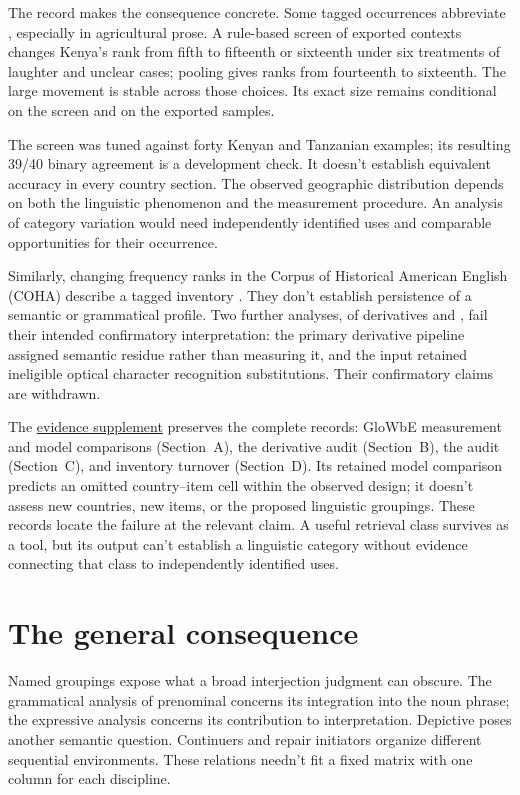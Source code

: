 \documentclass[12pt]{article}
\begin{document}
The  record makes the consequence concrete. Some tagged
occurrences abbreviate , especially in agricultural prose.
A rule-based screen of exported contexts changes Kenya's rank from fifth
to fifteenth or sixteenth under six treatments of laughter and unclear
cases; pooling gives ranks from fourteenth to sixteenth. The large
movement is stable across those choices. Its exact size remains
conditional on the screen and on the exported samples.

The screen was tuned against forty Kenyan and Tanzanian examples;
its resulting 39/40 binary agreement is a development check. It doesn't
establish equivalent accuracy in every country section. The observed
geographic distribution depends on both the linguistic
phenomenon and the measurement procedure. An analysis of category
variation would need independently identified uses and comparable
opportunities for their occurrence.

Similarly, changing frequency ranks in the Corpus of Historical American
English (COHA) describe a tagged inventory \citep{davies2010}.
They don't establish persistence of a semantic or grammatical profile.
Two further analyses, of derivatives and , fail their
intended confirmatory interpretation: the primary derivative pipeline
assigned semantic residue rather than measuring it, and the 
input retained ineligible optical character recognition substitutions.
Their confirmatory claims are withdrawn.

The \href{inquiry-relative-evidence-supplement.pdf}{evidence supplement}
preserves the complete records: GloWbE measurement and model comparisons
(Section~A), the derivative audit (Section~B), the  audit
(Section~C), and inventory turnover (Section~D). Its retained model
comparison predicts an omitted country--item cell within the observed
design; it doesn't assess new countries, new items, or the proposed
linguistic groupings. These records locate
the failure at the relevant claim. A useful retrieval class survives
as a tool, but its output can't establish a linguistic category
without evidence connecting that class to independently identified uses.

\section{The general consequence}\label{sec:discussion}

Named groupings expose what a broad interjection judgment can obscure.
The grammatical analysis of prenominal  concerns its
integration into the noun phrase; the expressive analysis concerns
its contribution to interpretation. Depictive  poses
another semantic question. Continuers and repair initiators organize
different sequential environments. These relations needn't fit a
fixed matrix with one column for each discipline.
\end{document}
